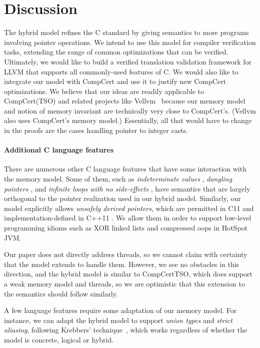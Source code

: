 \section{Discussion}
\label{sec:intptrcast:discussion}

The hybrid model refines the C standard by giving semantics to more programs involving pointer operations. We intend to use this model for compiler verification tasks, extending the range of common optimizations that can be verified. Ultimately, we would like to build a verified translation validation framework for LLVM that supports all commonly-used features of C. We would also like to integrate our model with CompCert and use it to justify new CompCert optimizations.
We believe that our ideas are readily applicable to CompCert(TSO) and
related projects like Vellvm~\cite{vellvm:popl12,vellvm:pldi13} because our memory model and notion of
memory invariant are technically very close to CompCert's. (Vellvm
also uses CompCert's memory model.) Essentially, all that would have
to change in the proofs are the cases handling pointer to integer
casts.

\paragraph{Additional C language features}

There are numerous other C language features that have some
interaction with the memory model.  Some of them, such as
\textit{indeterminate values} \cite[\S3.19.2p1]{iso2011iec}, \textit{dangling pointers}
\cite[\S6.2.4p2]{iso2011iec}, and \textit{infinite loops with no side-effects}
\cite[\S6.8.5p6]{iso2011iec}, have semantics that are largely orthogonal to
the pointer realization used in our hybrid model.
Similarly, our model explicitly allows \textit{unsafely derived pointers},
which are permitted in C11 and implementation-defined in C++11 \cite[\S3.7.4p4]{iso2011iec}. We allow them in order to support low-level
programming idioms such as XOR linked lists and compressed oops in
HotSpot JVM.

Our paper does not directly address threads, so we cannot claim with
certainty that the model extends to handle them.  However, we see no
obstacles in this direction, and the hybrid model is similar
to CompCertTSO, which does support a weak memory model and threads, so
we are optimistic that this extension to the semantics should follow similarly.

A few language features require some adaptation of our memory model.
For instance, we can adapt the hybrid model to support
\textit{union types} and \textit{strict aliasing}, following Krebbers'
technique~\cite{krebbers2013aliasing}, which works regardless of
whether the model is concrete, logical or hybrid.

